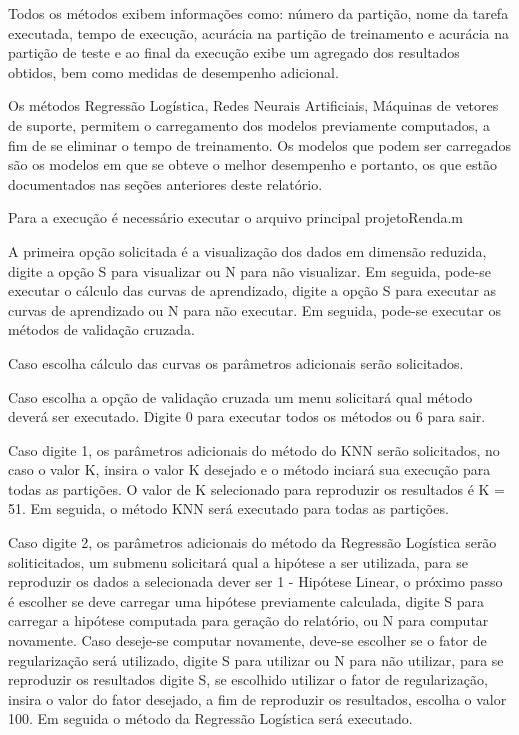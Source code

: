 
Todos os métodos exibem informações como: número da partição, nome da tarefa executada, tempo de execução, acurácia na partição de treinamento e acurácia na partição de teste e ao final da execução exibe um agregado dos resultados obtidos, bem como medidas de desempenho adicional.

Os métodos Regressão Logística, Redes Neurais Artificiais, Máquinas de vetores de suporte, permitem o carregamento dos modelos previamente computados, a fim de se eliminar o tempo de treinamento. Os modelos que podem ser carregados são os modelos em que se obteve o melhor desempenho e portanto, os que estão documentados nas seções anteriores deste relatório.

Para a execução é necessário executar o arquivo principal projetoRenda.m

A primeira opção solicitada é a visualização dos dados em dimensão reduzida, digite a opção S para visualizar ou N para não visualizar. Em seguida, pode-se executar o cálculo das curvas de aprendizado, digite a opção S para executar as curvas de aprendizado ou N para não executar. Em seguida, pode-se executar os métodos de validação cruzada.

Caso escolha cálculo das curvas os parâmetros adicionais serão solicitados.

Caso escolha a opção de validação cruzada um menu solicitará qual método deverá ser executado. Digite 0 para executar todos os métodos ou 6 para sair.

Caso digite 1, os parâmetros adicionais do método do KNN serão solicitados, no caso o valor K, insira o valor K desejado e o método inciará sua execução para todas as partições. O valor de K selecionado para reproduzir os resultados é K = 51. Em seguida, o método KNN será executado para todas as partições.

Caso digite 2, os parâmetros adicionais do método da Regressão Logística serão soliticitados, um submenu solicitará qual a hipótese a ser utilizada, para se reproduzir os dados a selecionada dever ser 1 - Hipótese Linear, o próximo passo é escolher se deve carregar uma hipótese previamente calculada, digite S para carregar a hipótese computada para geração do relatório, ou N para computar novamente. Caso deseje-se computar novamente, deve-se escolher se o fator de regularização será utilizado, digite S para utilizar ou N para não utilizar, para se reproduzir os resultados digite S, se escolhido utilizar o fator de regularização, insira o valor do fator desejado, a fim de reproduzir os resultados, escolha o valor 100. Em seguida o método da Regressão Logística será executado.

